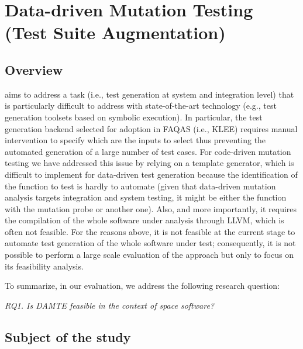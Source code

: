 \clearpage
\section{Data-driven Mutation Testing (Test Suite Augmentation)}
\label{sec:testGeneration:dataDriven}

\STARTCHANGEDFINAL

\subsection{Overview}

\DAMTE aims to address a task (i.e., test generation at system and integration level) that is particularly difficult to address with state-of-the-art technology (e.g., test generation toolsets based on symbolic execution). In particular, the test generation backend selected for adoption in FAQAS (i.e., KLEE) requires manual intervention to specify which are the inputs to select thus preventing the automated generation of a large number of test cases. For code-driven mutation testing we have addressed this issue by relying on a template generator, which is difficult to implement for data-driven test generation because the identification of the function to test is hardly to automate (given that data-driven mutation analysis targets integration and system testing, it might be either the function with the mutation probe or another one). Also, and more importantly, it requires the compilation of the whole software under analysis through LLVM, which is often not feasible. For the reasons above, it is not feasible at the current stage to automate test generation of the whole software under test; consequently, 
it is not possible to perform a large scale evaluation of the approach but only to focus on its feasibility analysis.

To summarize, in our evaluation, we address the following research question:

\emph{RQ1. Is DAMTE feasible in the context of space software?} 



\subsection{Subject of the study}

